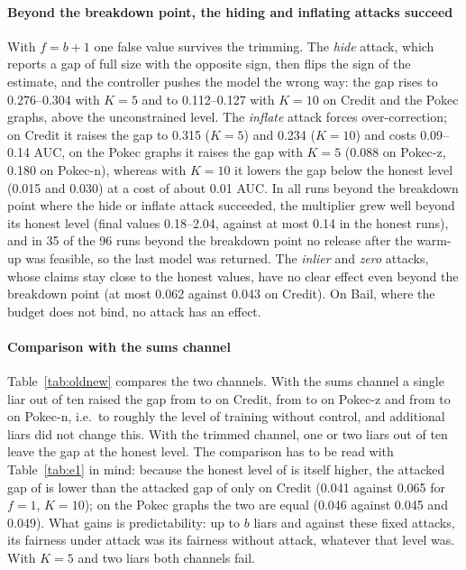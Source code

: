 \paragraph{Beyond the breakdown point, the hiding and inflating attacks succeed}
With $f=b+1$ one false value survives the trimming. The \emph{hide} attack, which reports a gap of full size with the opposite sign, then flips the sign of the estimate, and the controller pushes the model the wrong way: the gap rises to 0.276--0.304 with $K=5$ and to 0.112--0.127 with $K=10$ on Credit and the Pokec graphs, above the unconstrained level. The \emph{inflate} attack forces over-correction; on Credit it raises the gap to 0.315 ($K=5$) and 0.234 ($K=10$) and costs 0.09--0.14 AUC, on the Pokec graphs it raises the gap with $K=5$ (0.088 on Pokec-z, 0.180 on Pokec-n), whereas with $K=10$ it lowers the gap below the honest level (0.015 and 0.030) at a cost of about 0.01 AUC. In all runs beyond the breakdown point where the hide or inflate attack succeeded, the multiplier grew well beyond its honest level (final values 0.18--2.04, against at most 0.14 in the honest runs), and in 35 of the 96 runs beyond the breakdown point no release after the warm-up was feasible, so the last model was returned. The \emph{inlier} and \emph{zero} attacks, whose claims stay close to the honest values, have no clear effect even beyond the breakdown point (at most 0.062 against 0.043 on Credit). On Bail, where the budget does not bind, no attack has an effect.

\paragraph{Comparison with the sums channel}
Table~\ref{tab:oldnew} compares the two channels. With the sums channel a single liar out of ten raised the gap from \oldCreditKtenHon{} to \oldCreditKtenOne{} on Credit, from \oldPokeczKtenHon{} to \oldPokeczKtenOne{} on Pokec-z and from \oldPokecnKtenHon{} to \oldPokecnKtenOne{} on Pokec-n, i.e.\ to roughly the level of training without control, and additional liars did not change this. With the trimmed channel, one or two liars out of ten leave the gap at the honest level. The comparison has to be read with Table~\ref{tab:e1} in mind: because the honest level of \rt{} is itself higher, the attacked gap of \rt{} is lower than the attacked gap of \clamp{} only on Credit (0.041 against 0.065 for $f=1$, $K=10$); on the Pokec graphs the two are equal (0.046 against 0.045 and 0.049). What \rt{} gains is predictability: up to $b$ liars and against these fixed attacks, its fairness under attack was its fairness without attack, whatever that level was. With $K=5$ and two liars both channels fail.

